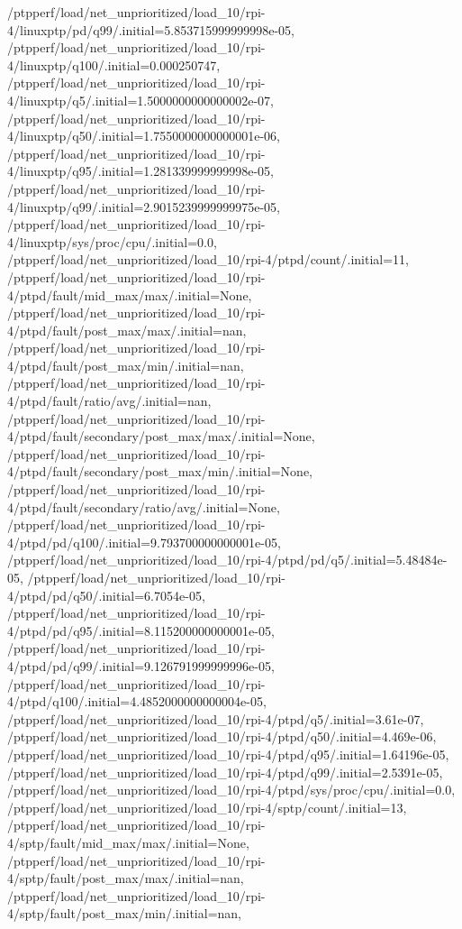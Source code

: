 {    /ptpperf/load/net_unprioritized/load_10/rpi-4/linuxptp/pd/q99/.initial=5.853715999999998e-05,
    /ptpperf/load/net_unprioritized/load_10/rpi-4/linuxptp/q100/.initial=0.000250747,
    /ptpperf/load/net_unprioritized/load_10/rpi-4/linuxptp/q5/.initial=1.5000000000000002e-07,
    /ptpperf/load/net_unprioritized/load_10/rpi-4/linuxptp/q50/.initial=1.7550000000000001e-06,
    /ptpperf/load/net_unprioritized/load_10/rpi-4/linuxptp/q95/.initial=1.281339999999998e-05,
    /ptpperf/load/net_unprioritized/load_10/rpi-4/linuxptp/q99/.initial=2.9015239999999975e-05,
    /ptpperf/load/net_unprioritized/load_10/rpi-4/linuxptp/sys/proc/cpu/.initial=0.0,
    /ptpperf/load/net_unprioritized/load_10/rpi-4/ptpd/count/.initial=11,
    /ptpperf/load/net_unprioritized/load_10/rpi-4/ptpd/fault/mid_max/max/.initial=None,
    /ptpperf/load/net_unprioritized/load_10/rpi-4/ptpd/fault/post_max/max/.initial=nan,
    /ptpperf/load/net_unprioritized/load_10/rpi-4/ptpd/fault/post_max/min/.initial=nan,
    /ptpperf/load/net_unprioritized/load_10/rpi-4/ptpd/fault/ratio/avg/.initial=nan,
    /ptpperf/load/net_unprioritized/load_10/rpi-4/ptpd/fault/secondary/post_max/max/.initial=None,
    /ptpperf/load/net_unprioritized/load_10/rpi-4/ptpd/fault/secondary/post_max/min/.initial=None,
    /ptpperf/load/net_unprioritized/load_10/rpi-4/ptpd/fault/secondary/ratio/avg/.initial=None,
    /ptpperf/load/net_unprioritized/load_10/rpi-4/ptpd/pd/q100/.initial=9.793700000000001e-05,
    /ptpperf/load/net_unprioritized/load_10/rpi-4/ptpd/pd/q5/.initial=5.48484e-05,
    /ptpperf/load/net_unprioritized/load_10/rpi-4/ptpd/pd/q50/.initial=6.7054e-05,
    /ptpperf/load/net_unprioritized/load_10/rpi-4/ptpd/pd/q95/.initial=8.115200000000001e-05,
    /ptpperf/load/net_unprioritized/load_10/rpi-4/ptpd/pd/q99/.initial=9.126791999999996e-05,
    /ptpperf/load/net_unprioritized/load_10/rpi-4/ptpd/q100/.initial=4.4852000000000004e-05,
    /ptpperf/load/net_unprioritized/load_10/rpi-4/ptpd/q5/.initial=3.61e-07,
    /ptpperf/load/net_unprioritized/load_10/rpi-4/ptpd/q50/.initial=4.469e-06,
    /ptpperf/load/net_unprioritized/load_10/rpi-4/ptpd/q95/.initial=1.64196e-05,
    /ptpperf/load/net_unprioritized/load_10/rpi-4/ptpd/q99/.initial=2.5391e-05,
    /ptpperf/load/net_unprioritized/load_10/rpi-4/ptpd/sys/proc/cpu/.initial=0.0,
    /ptpperf/load/net_unprioritized/load_10/rpi-4/sptp/count/.initial=13,
    /ptpperf/load/net_unprioritized/load_10/rpi-4/sptp/fault/mid_max/max/.initial=None,
    /ptpperf/load/net_unprioritized/load_10/rpi-4/sptp/fault/post_max/max/.initial=nan,
    /ptpperf/load/net_unprioritized/load_10/rpi-4/sptp/fault/post_max/min/.initial=nan,
}
